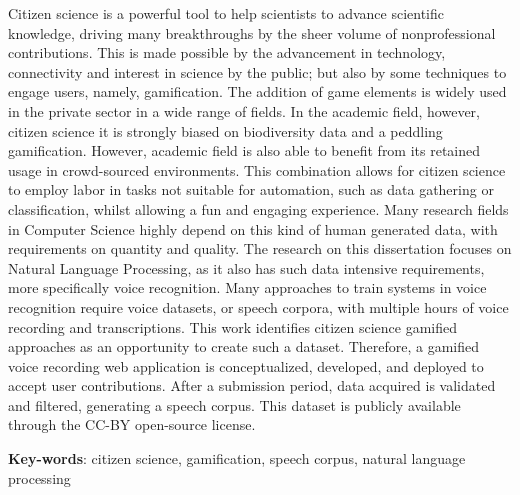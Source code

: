 
\setlength{\absparsep}{18pt}
\begin{resumo}
    Citizen science is a powerful tool to help scientists to advance scientific knowledge, driving many breakthroughs by the sheer volume of nonprofessional contributions. This is made possible by the advancement in technology, connectivity and interest in science by the public; but also by some techniques to engage users, namely, gamification. The addition of game elements is widely used in the private sector in a wide range of fields. In the academic field, however, citizen science it is strongly biased on biodiversity data and a peddling gamification. However, academic field is also able to benefit from its retained usage in crowd-sourced environments. This combination allows for citizen science to employ labor in tasks not suitable for automation, such as data gathering or classification, whilst allowing a fun and engaging experience. Many research fields in Computer Science highly depend on this kind of human generated data, with requirements on quantity and quality. The research on this dissertation focuses on Natural Language Processing, as it also has such data intensive requirements, more specifically voice recognition. Many approaches to train systems in voice recognition require voice datasets, or speech corpora, with multiple hours of voice recording and transcriptions. This work identifies citizen science gamified approaches as an opportunity to create such a dataset. Therefore, a gamified voice recording web application is conceptualized, developed, and deployed to accept user contributions. After a submission period, data acquired is validated and filtered, generating a speech corpus. This dataset is publicly available through the CC-BY open-source license.
	\vspace{\onelineskip}
	\noindent 
	
	\textbf{Key-words}: citizen science, gamification, speech corpus, natural language processing
\end{resumo}
